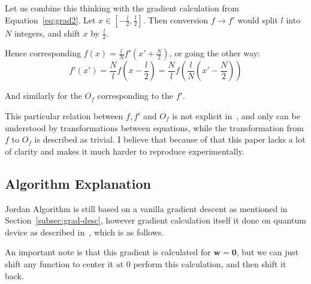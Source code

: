 \documentclass{article}
\begin{document}
Let us combine this thinking with the gradient calculation from Equation~\ref{eq:grad2}. Let $x \in [-\frac{l}{2}, \frac{l}{2}]$.
Then conversion $f \rightarrow f'$ would split $l$ into $N$ integers, and shift $x$ by $\frac{l}{2}$.

Hence corresponding $f(x) = \frac{l}{N}f'(x' + \frac{N}{2})$, or going the other way:
\begin{equation}
    \label{eq:func-conversion}
    f'(x') = \frac{N}{l}f(x - \frac{l}{2}) = \frac{N}{l}f(\frac{l}{N}(x' - \frac{N}{2}))
\end{equation}

And similarly for the $O_f$ corresponding to the $f'$.

This particular relation between $f, f'$ and $O_f$ is not explicit in~\cite{Jordan_2005},
and only can be understood by transformations between equations, while the transformation from $f$ to $O_f$ is described as trivial.
I believe that because of that this paper lacks a lot of clarity and makes it much harder to reproduce experimentally.

\subsection{Algorithm Explanation}
\label{sec:jord-expl}
Jordan Algorithm is still based on a vanilla gradient descent as mentioned in Section~\ref{subsec:grad-desc},
however gradient calculation itself it done on quantum device as described in~\cite{Jordan_2005}, which is as follows.

An important note is that this gradient is calculated for $\pmb{w} = \pmb{0}$, but we can just shift any function to center it at $0$ perform this calculation, and then shift it back.
\end{document}
